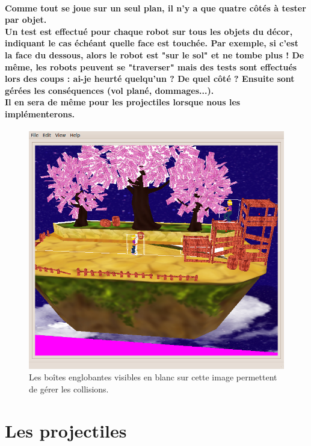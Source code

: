 \paragraph{Comme tout se joue sur un seul plan, il n'y a que quatre côtés à tester par objet.\\
Un test est effectué pour chaque robot sur tous les objets du décor, indiquant le cas échéant quelle face est touchée. Par exemple, si c'est la face du dessous, alors le robot est  "sur le sol" et ne tombe plus !
De même, les robots peuvent se "traverser" mais des tests sont effectués lors des coups : ai-je heurté quelqu'un ? De quel côté ? Ensuite sont gérées les conséquences (vol plané, dommages...).\\
Il en sera de même pour les projectiles lorsque nous les implémenterons.}

\begin{figure}[h!]
	\center
	\includegraphics[scale=0.4]{visuel/capture-rev192-collision.png}
	\caption{Les bo\^ites englobantes visibles en blanc sur cette image permettent de gérer les collisions.}
\end{figure}



\newpage
\section{Les projectiles}
\vspace{0.5cm}

